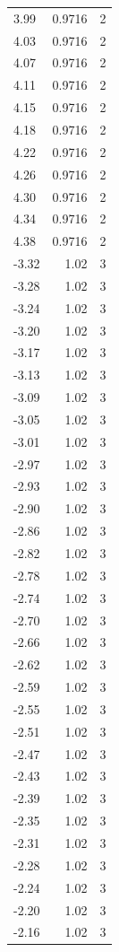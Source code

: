 \begin{longtable}{lrr}
  3.99 & 0.9716 & 2 \\
  4.03 & 0.9716 & 2 \\
  4.07 & 0.9716 & 2 \\
  4.11 & 0.9716 & 2 \\
  4.15 & 0.9716 & 2 \\
  4.18 & 0.9716 & 2 \\
  4.22 & 0.9716 & 2 \\
  4.26 & 0.9716 & 2 \\
  4.30 & 0.9716 & 2 \\
  4.34 & 0.9716 & 2 \\
  4.38 & 0.9716 & 2 \\
  -3.32 & 1.02 & 3 \\
  -3.28 & 1.02 & 3 \\
  -3.24 & 1.02 & 3 \\
  -3.20 & 1.02 & 3 \\
  -3.17 & 1.02 & 3 \\
  -3.13 & 1.02 & 3 \\
  -3.09 & 1.02 & 3 \\
  -3.05 & 1.02 & 3 \\
  -3.01 & 1.02 & 3 \\
  -2.97 & 1.02 & 3 \\
  -2.93 & 1.02 & 3 \\
  -2.90 & 1.02 & 3 \\
  -2.86 & 1.02 & 3 \\
  -2.82 & 1.02 & 3 \\
  -2.78 & 1.02 & 3 \\
  -2.74 & 1.02 & 3 \\
  -2.70 & 1.02 & 3 \\
  -2.66 & 1.02 & 3 \\
  -2.62 & 1.02 & 3 \\
  -2.59 & 1.02 & 3 \\
  -2.55 & 1.02 & 3 \\
  -2.51 & 1.02 & 3 \\
  -2.47 & 1.02 & 3 \\
  -2.43 & 1.02 & 3 \\
  -2.39 & 1.02 & 3 \\
  -2.35 & 1.02 & 3 \\
  -2.31 & 1.02 & 3 \\
  -2.28 & 1.02 & 3 \\
  -2.24 & 1.02 & 3 \\
  -2.20 & 1.02 & 3 \\
  -2.16 & 1.02 & 3 \\

\end{longtable}

